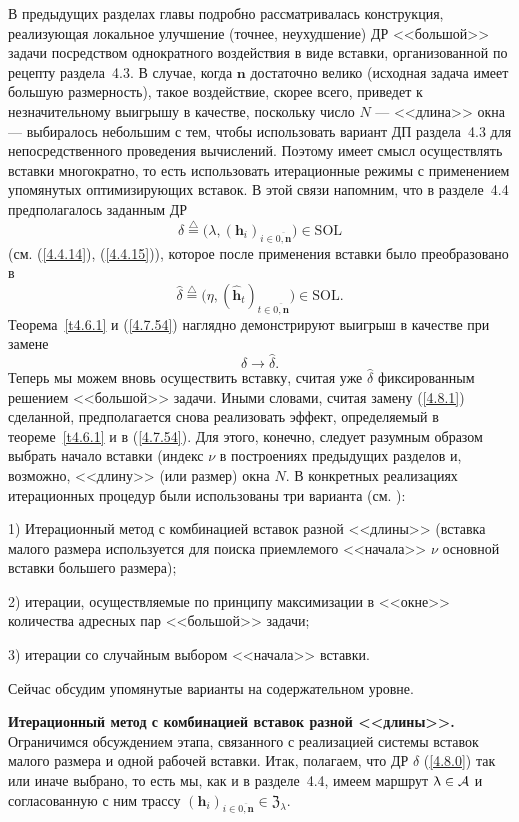 \documentclass[11pt,twoside,openany]{report}
\newcommand{\bfn}{\begin{equation}}
\newcommand{\efn}{\end{equation}}
\newcommand{\df}{\stackrel{\triangle}{=}}
\newcommand{\ov}{\overline}
\newcommand{\la}{\lambda}
\newcommand{\ca}{{\cal A}}
\newcommand{\nn}{{\mathbf n}}
\begin{document}
{{В предыдущих разделах главы подробно рассматривалась конструкция, реализующая локальное улучшение
(точнее, неухудшение) ДР <<большой>> задачи посредством однократного воздействия в виде вставки,
организованной по рецепту раздела~4.3. В случае, когда $\nn$ достаточно велико (исходная задача
имеет большую размерность), такое воздействие, скорее всего, приведет к незначительному выигрышу
в качестве, поскольку число $N$ --- <<длина>> окна ---   выбиралось небольшим с тем, чтобы
использовать вариант ДП раздела~4.3 для непосредственного проведения вычислений. Поэтому имеет
смысл  осуществлять вставки многократно, то есть использовать итерационные режимы с применением
упомянутых оптимизирующих вставок. В этой связи напомним, что в разделе~4.4 предполагалось заданным ДР
\bfn\label{4.8.0}\delta\df \bigl(\la,(\mathbf{h}_i)_{i\in\ov{0,\nn}}\bigl)\in \mathrm{SOL}
\efn
(см. (\ref{4.4.14}), (\ref{4.4.15})), которое после применения вставки было преобразовано в
$$\hat{\delta}\df \bigl(\eta,(\hat{\mathbf{h}}_t)_{t\in\ov{0,\nn}}\bigl)\in \mathrm{SOL}.
$$
Теорема~\ref{t4.6.1} и  (\ref{4.7.54}) наглядно демонстрируют выигрыш в качестве при замене
\bfn\label{4.8.1}\delta \longrightarrow \hat{\delta}.
\efn
Теперь мы можем вновь осуществить вставку, считая уже $\hat{\delta}$ фиксированным решением
<<большой>> задачи. Иными словами, считая замену (\ref{4.8.1}) сделанной, предполагается снова
реализовать эффект, определяемый в теореме~\ref{t4.6.1} и в (\ref{4.7.54}). Для этого, конечно,
следует разумным образом выбрать начало вставки (индекс $\nu$ в построениях предыдущих разделов
и, возможно, <<длину>> (или размер) окна $N.$ В конкретных реализациях итерационных процедур были
использованы три варианта (см. \cite{Cha18`}):

1) Итерационный метод с комбинацией вставок разной <<длины>> (вставка малого размера используется
для поиска приемлемого <<начала>> $\nu$ основной вставки большего размера);

2) итерации, осуществляемые  по принципу максимизации в <<окне>> количества адресных пар
 <<большой>> задачи;

3) итерации со случайным выбором <<начала>> вставки.

Сейчас обсудим упомянутые варианты на содержательном уровне.

{\bf Итерационный метод с комбинацией вставок разной <<длины>>.} Ограничимся обсуждением этапа,
связанного с реализацией системы вставок малого размера и одной рабочей вставки. Итак, полагаем,
что ДР $\delta$ (\ref{4.8.0}) так или иначе выбрано, то есть мы, как и в разделе~4.4,
имеем маршрут $\la\in\ca$ и согласованную с ним трассу $(\mathbf{h}_i)_{i\in\ov{0,\nn}}\in \mathfrak{Z}_\la.$

}}
\end{document}
